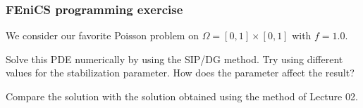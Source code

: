\begin{frame}
  \frametitle{FEniCS programming exercise}

  We consider our favorite Poisson problem on $\Omega = [0,1] \times
  [0,1]$ with $f = 1.0$.

  \bigskip

  Solve this PDE numerically by using the SIP/DG method. Try using
  different values for the stabilization parameter. How does the
  parameter affect the result?

  \bigskip

  Compare the solution with the solution obtained using the method of
  Lecture 02.
\end{frame}
